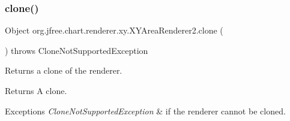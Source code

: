 \subsubsection{\texorpdfstring{clone()}{clone()}}
{\footnotesize\ttfamily Object org.\+jfree.\+chart.\+renderer.\+xy.\+X\+Y\+Area\+Renderer2.\+clone (\begin{DoxyParamCaption}{ }\end{DoxyParamCaption}) throws Clone\+Not\+Supported\+Exception}

Returns a clone of the renderer.

\begin{DoxyReturn}{Returns}
A clone.
\end{DoxyReturn}

\begin{DoxyExceptions}{Exceptions}
{\em Clone\+Not\+Supported\+Exception} & if the renderer cannot be cloned. \\
\hline
\end{DoxyExceptions}
\mbox{\label{classorg_1_1jfree_1_1chart_1_1renderer_1_1xy_1_1_x_y_area_renderer2_a472953c4ef7f86db3907265bff0ba675}} 
